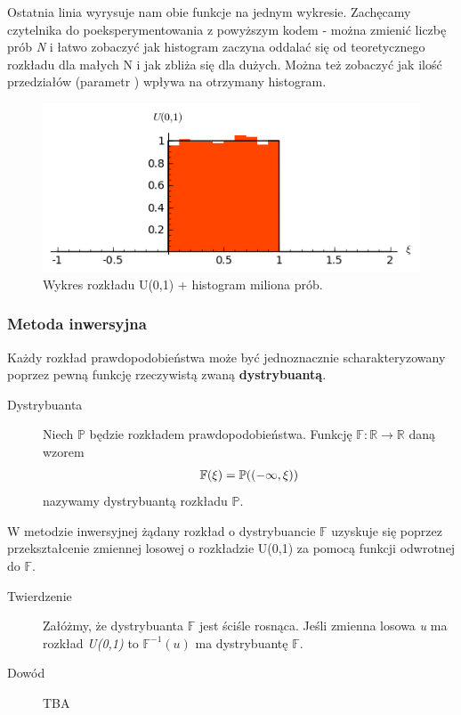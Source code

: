 \documentclass[a4paper,12pt,polish]{sphinxmanual}
\begin{document}
Ostatnia linia wyrysuje nam obie funkcje na jednym wykresie. Zachęcamy czytelnika do poeksperymentowania z
powyższym kodem - można zmienić liczbę prób \emph{N} i łatwo zobaczyć jak histogram zaczyna oddalać się od
teoretycznego rozkładu dla małych N i jak zbliża się dla dużych. Można też zobaczyć jak ilość przedziałów
(parametr ) wpływa na otrzymany histogram.
\begin{figure}[htbp]
\centering
\capstart

\includegraphics{u01_hist.png}
\caption{Wykres rozkładu U(0,1) + histogram miliona prób.}\end{figure}


\subsubsection{Metoda inwersyjna}
\label{ch5/chV011:metoda-inwersyjna}
Każdy rozkład prawdopodobieństwa może być jednoznacznie scharakteryzowany poprzez pewną funkcję
rzeczywistą zwaną \textbf{dystrybuantą}.
\begin{description}
\item[{Dystrybuanta}] \leavevmode
Niech $\mathbb{P}$ będzie rozkładem prawdopodobieństwa. Funkcję
$\mathbb{F}: \mathbb{R} \to \mathbb{R}$ daną wzorem
\begin{gather}
\begin{split}\mathbb{F}(\xi) = \mathbb{P}((-\infty, \xi))\end{split}\notag
\end{gather}
nazywamy dystrybuantą rozkładu $\mathbb{P}$.

\end{description}

W metodzie inwersyjnej żądany rozkład o dystrybuancie $\mathbb{F}$ uzyskuje się poprzez przekształcenie
zmiennej losowej o rozkładzie U(0,1) za pomocą funkcji odwrotnej do $\mathbb{F}$.
\begin{description}
\item[{Twierdzenie}] \leavevmode
Załóżmy, że dystrybuanta $\mathbb{F}$ jest ściśle rosnąca. Jeśli zmienna losowa \emph{u} ma
rozkład \emph{U(0,1)} to $\mathbb{F}^{-1}(u)$ ma dystrybuantę $\mathbb{F}$.

\item[{Dowód}] \leavevmode
TBA

\end{description}
\end{document}
